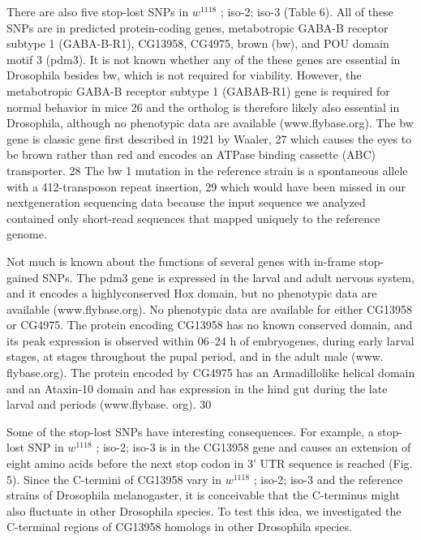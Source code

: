 There are also five stop-lost SNPs in $w^{1118}$ ; iso-2; iso-3 (Table 6). All of these SNPs are in predicted protein-coding genes, metabotropic GABA-B receptor subtype 1 (GABA-B-R1), CG13958, CG4975, brown (bw), and POU domain motif 3 (pdm3). It is not known whether any of the these genes are essential in Drosophila besides bw, which is not required for viability.  However, the metabotropic GABA-B receptor subtype 1 (GABAB-R1) gene is required for normal behavior in mice 26 and the ortholog is therefore likely also essential in Drosophila, although no phenotypic data are available (www.flybase.org). The bw gene is classic gene first described in 1921 by Waaler, 27 which causes the eyes to be brown rather than red and encodes an ATPase binding cassette (ABC) transporter. 28 The bw 1 mutation in the reference strain is a spontaneous allele with a 412-transposon repeat insertion, 29 which would have been missed in our nextgeneration sequencing data because the input sequence we analyzed contained only short-read sequences that mapped uniquely to the reference genome.

Not much is known about the functions of several genes with in-frame stop-gained SNPs. The pdm3 gene is expressed in the larval and adult nervous system, and it encodes a highlyconserved Hox domain, but no phenotypic data are available (www.flybase.org). No phenotypic data are available for either CG13958 or CG4975. The protein encoding CG13958 has no known conserved domain, and its peak expression is observed within 06–24 h of embryogenes, during early larval stages, at stages throughout the pupal period, and in the adult male (www.  flybase.org). The protein encoded by CG4975 has an Armadillolike helical domain and an Ataxin-10 domain and has expression in the hind gut during the late larval and periods (www.flybase.  org). 30

Some of the stop-lost SNPs have interesting consequences. For example, a stop-lost SNP in $w^{1118}$ ; iso-2; iso-3 is in the CG13958 gene and causes an extension of eight amino acids before the next stop codon in 3' UTR sequence is reached (Fig. 5). Since the C-termini of CG13958 vary in $w^{1118}$ ; iso-2; iso-3 and the reference strains of Drosophila melanogaster, it is conceivable that the C-terminus might also fluctuate in other Drosophila species. To test this idea, we investigated the C-terminal regions of CG13958 homologs in other Drosophila species.


